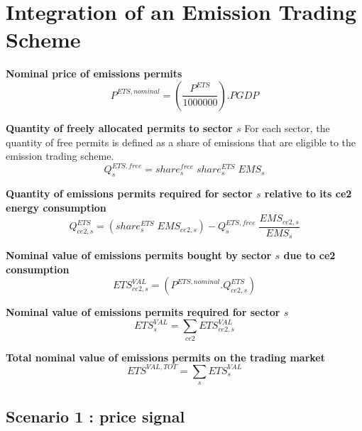 \documentclass[12pt]{article}
\numberwithin{equation}{section}
\begin{document}
\section{Integration of an Emission Trading Scheme}



\noindent \textbf{Nominal price of emissions permits} 
\begin{dmath}
P^{ETS,nominal} = \left( \frac{P^{ETS}}{1000000} \right) . PGDP
\label{ETS.mdlP_ETS_nominal}
\end{dmath}

\noindent \textbf{Quantity of freely allocated permits to sector $s$} 
For each sector, the quantity of free permits is defined as a share of emissions that are eligible to the emission trading scheme. \\
\begin{dmath}
Q^{ETS,free}_{s} = share^{free}_{s} \; share^{ETS}_{s} \; EMS_{s}
\label{ETS.mdlQ_ETS_free[s]}
\end{dmath}

\noindent \textbf{Quantity of emissions permits required for sector $s$ relative to its ce2 energy consumption} 
\begin{dmath}
Q^{ETS}_{ce2, s} = \left( share^{ETS}_{s} \; EMS_{ce2, s} \right) - Q^{ETS,free}_{s} \; \frac{EMS_{ce2, s}}{EMS_{s}}
\label{ETS.mdlQ_ETS[ce2, s]}
\end{dmath}

\noindent \textbf{Nominal value of emissions permits bought by sector $s$ due to ce2 consumption} 
\begin{dmath}
ETS^{VAL}_{ce2, s} = \left( P^{ETS,nominal} . Q^{ETS}_{ce2, s} \right)
\label{ETS.mdlETS_VAL[ce2, s]}
\end{dmath}

\noindent \textbf{Nominal value of emissions permits required for sector $s$} 
\begin{dmath}
ETS^{VAL}_{s} = \sum_{ce2} ETS^{VAL}_{ce2, s}
\label{ETS.mdlETS_VAL[s]}
\end{dmath}

\noindent \textbf{Total nominal value of emissions permits on the trading market} 
\begin{dmath}
ETS^{VAL,TOT} = \sum_{s} ETS^{VAL}_{s}
\label{ETS.mdlETS_VAL_TOT}
\end{dmath}



\subsection{Scenario 1 : price signal}
\end{document}
